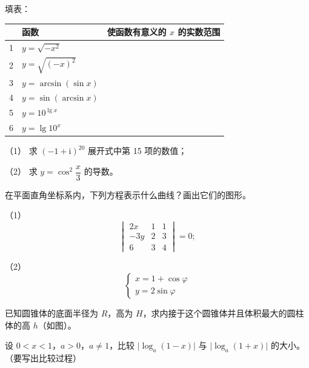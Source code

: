 \begin{question}
填表：

\begin{center}
\begin{tabular}{lll}
\toprule
 & 函数 & 使函数有意义的 $x$ 的实数范围 \\
\midrule
1 & $y=\sqrt{-x^2}$ &  \\
2 & $y=\sqrt{(-x)^2}$ &  \\
3 & $y=\arcsin(\sin x)$ &  \\
4 & $y=\sin(\arcsin x)$ &  \\
5 & $y=10^{\lg x}$ &  \\
6 & $y=\lg 10^x$ &  \\
\bottomrule
\end{tabular}
\end{center}

\end{question}
\begin{question}

（1） 求 $(-1+\mathrm i)^{20}$ 展开式中第 15 项的数值；

（2） 求 $y=\cos^2\dfrac{x}{3}$ 的导数。

\end{question}
\begin{question}
在平面直角坐标系内，下列方程表示什么曲线？画出它们的图形。

（1） 
\nopagebreak[4]
\[
\begin{vmatrix}
2x & 1 & 1\\
-3y & 2 & 3\\
6 & 3 & 4
\end{vmatrix}=0;
\]

（2） 
\nopagebreak[4]
\[
\begin{cases}
x=1+\cos\varphi\\
y=2\sin\varphi
\end{cases}
\]

\Needspace{0.4\textheight}
\end{question}
\begin{question}
已知圆锥体的底面半径为 $R$，高为 $H$，求内接于这个圆锥体并且体积最大的圆柱体的高 $h$（如图）。
\nopagebreak[4]
\begin{center}\end{center}
\nopagebreak[4]
\end{question}
\begin{question}
设 $0<x<1$，$a>0$，$a\ne1$，比较 $\lvert\log_a(1-x)\rvert$ 与 $\lvert\log_a(1+x)\rvert$ 的大小。（要写出比较过程）

\Needspace{0.4\textheight}
\end{question}
